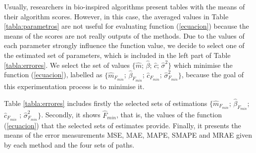 \documentclass{sig-alternate}
\begin{document}
Usually, researchers  in bio-inspired algorithms present tables with the means of their algorithm scores. However, in this case, the averaged values in Table \ref{tabla:parametros} are not useful for evaluating function (\ref{ecuacion}) because the means of the scores are not really outputs of the methods. Due to the values of each parameter strongly influence the function value, we decide to select one of the estimated set of parameters, which is included in the left part of Table \ref{tabla:errores}. We select the set of values $\{\hat{m}$; $\hat{\beta}$; $\hat{c}$; $\hat{\sigma}^2 \}$ which minimise the function (\ref{ecuacion}), labelled as $\{\hat{m}_{F_{min}}$; $\hat{\beta}_{F_{min}}$; $\hat{c}_{F_{min}}$; $\hat{\sigma}^2_{F_{min}}\}$, because the goal of this experimentation process is to minimise it.


Table \ref{tabla:errores} includes firstly the selected sets of estimations $\{\hat{m}_{F_{min}}$; $\hat{\beta}_{F_{min}}$; $\hat{c}_{F_{min}}$ ; $\hat{\sigma}^2_{F_{min}}\}$. Secondly, it shows $\hat{F}_{min}$, that is, the values of the function (\ref{ecuacion}) that the selected sets of estimates provide. Finally, it presents the means of the error measurements MSE, MAE, MAPE, SMAPE and MRAE given by each method and the four sets of paths.
\end{document}
